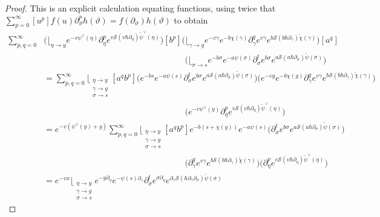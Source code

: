 \documentclass[10pt,a4paper,oneside,no-math,reqno]{amsart}%
\theoremstyle{plain}
\theoremstyle{definition}
\theoremstyle{remark}
\numberwithin{equation}{section}
\renewcommand{\theta}{\vartheta}
\newcommand{\mc}[1]{\mathcal{#1}}
\newcommand{\1}{\mathds{1}}
\newcommand{\<}{\langle}
\renewcommand{\>}{\rangle}
\newcommand{\del}{\partial}
\begin{document}
\begin{proof}
	This is an explicit calculation equating functions, using twice that $ \sum_{p = 0}^\infty [u^p]f(u) \del_\theta^p h(\theta) = f(\del_\theta ) h(\theta)$ to obtain
	\begin{align*}
			\sum_{p,q=0}^\infty
			&
			\bigg(  \Big\lfloor_{\eta \to y} e^{-v \psi^\vee (\eta)} \del_\eta^p  e^{v \mc{S}(v \hbar \del_{\eta}) \tilde{\psi}^\vee (\eta)}\bigg)
			[b^p ]
			\bigg( \Big\lfloor_{\gamma \to g} e^{-v \gamma} e^{-b \chi (\gamma)} \del_\gamma^q e^{v \gamma} e^{b \mc{S}(b \hbar \del_\gamma) \tilde{\chi} (\gamma) } \bigg) [a^q]
			\\
			&\hspace{7cm}
			\bigg(  \Big\lfloor_{\sigma \to s} e^{-b \sigma} e^{-a \psi (\sigma)} \del_\sigma^t e^{b \sigma} e^{a \mc{S}(a \hbar \del_\sigma)\tilde{\psi} (\sigma) } \bigg)
			\\
			&=
			\sum_{p,q=0}^\infty \Big\lfloor_{\substack{\eta \to y \\ \gamma \to g \\ \sigma \to s}}
			[a^q b^p ]
			\bigg( e^{-b s} e^{-a \psi (s)} \del_\sigma^t e^{b \sigma} e^{a \mc{S}(a \hbar \del_\sigma)\tilde{\psi} (\sigma) } \bigg)
			\bigg( e^{-v g} e^{-b \chi (g)} \del_\gamma^q e^{v \gamma} e^{b \mc{S}(b \hbar \del_\gamma ) \tilde{\chi} (\gamma) } \bigg)
			\\
			&\hspace{7cm}
			\bigg( e^{-v \psi^\vee (y)} \del_{\eta}^p  e^{v \mc{S}(v \hbar \del_{\eta}) \tilde{\psi}^\vee (\eta)}\bigg)
			\\
			&=
			e^{-v (\psi^\vee (y)+ g)}
			\sum_{p,q=0}^\infty \Big\lfloor_{\substack{\eta \to y \\ \gamma \to g \\ \sigma \to s}}
			[a^q b^p ]
			e^{-b (s+ \chi (g))} e^{-a \psi (s)} 
			\bigg( \del_\sigma^t e^{b \sigma} e^{a \mc{S}(a \hbar \del_\sigma)\tilde{\psi} (\sigma) } \bigg)
			\\
			&\hspace{7cm}
			\bigg( \del_\gamma^q e^{v \gamma} e^{b \mc{S}(b \hbar \del_\gamma)\tilde{\chi} (\gamma) } \bigg)
			\bigg( \del_\eta^p  e^{v \mc{S}(v \hbar \del_{\eta}) \tilde{\psi}^\vee (\eta)}\bigg)
			\\
			&=
			e^{-v x}
			\Big\lfloor_{\substack{\eta \to y \\ \gamma \to g \\ \sigma \to s}}
			e^{- y \del_\eta} e^{- \psi (s) \del_\gamma} 
			\del_\sigma^t e^{\sigma \del_\eta} e^{ \del_\gamma \mc{S}( \hbar \del_\gamma \del_\sigma )\tilde{\psi} (\sigma) }

\end{align*}
\end{proof}
\end{document}
